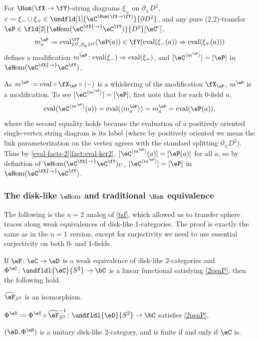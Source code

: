 \documentclass[12pt,reqno]{amsart}
\newcommand{\eFun}{{\eH}\mathrm{om}}
\newcommand{\eHom}{{\eH}\mathrm{om}}
\newcommand{\eval}{\mathrm{eval}}
\newcommand{\psn}{\Phi}
\newcommand{\C}{\eC}
\newcommand{\D}{\eD}
\DeclareRobustCommand{\coloneq}{\mathrel{\vcenter{\baselineskip0.5ex\lineskiplimit0pt\hbox{\scriptsize{\upshape.}}\hbox{\scriptsize{\upshape.}}}}=}
\newcommand{\lU}[1]{#1_U}
\begin{document}
\begin{lemma}[$\C^{(-)}$ is surjective on (2,2)-transfors]
\label{lem:surj-2-fields}
For $\Hom(\fX\to\fY)$-string diagrams $\xi_{\pm}$ on $\partial_\pm D^2$, $c\coloneq \xi_-\cup\xi_+\in\undfld[1]{\C^{\Hom(\fX\to\fY)}}{\partial D^2}$, and any pure (2,2)-transfor $\eP\in\fld[2]{\eFun(\C^\fX{\to}\C^\fY)}{D^2}[\C^{c}]$,
\[
m^\eP_a \coloneq\eval_{D^2,\partial_{\pm}D^2}^\fY(\eP(a)) \in\fY(\eval(\xi_-(a))\Rightarrow\eval(\xi_+(a)))
\]
defines a modification $m^\eP\colon\eval(\xi_-)\Rightarrow\eval(\xi_+)$, and $[\C^{\langle m^\eP\rangle}]=[\eP]$ in $\eFun(\C^\fX{\to}\C^\fY)$.
\end{lemma}

\begin{pf}
As $m^\eP\coloneq\eval\circ\fX_\eP\circ\langle-\rangle$ is a whiskering of the modification $\fX_\eP$, $m^\eP$ is a modification. To see $[\C^{\langle m^\eP\rangle}]=[\eP]$, first note that for each $0$-field $a$,
$$\mathrm{eval}(\C^{\langle m^\eP\rangle}(a))=\eval(\langle m^\eP_a\rangle)= m^\eP_a=\mathrm{eval}(\eP(a)),$$
where the second equality holds because the evaluation of a positively oriented single-vertex string diagram is its label (where by positively oriented we mean the link parameterization on the vertex agrees with the standard splitting $\partial_{\pm}D^2$). Thus by \cref{eval-facts-2}\ref{fact:eval-ker2}, $[\C^{\langle m^\eP\rangle}(a)]=[\eP(a)]$ for all $a$, so by definition of $\lU{\eFun(\C^\fX{\to}\C^\fY)}$, $[\C^{\langle m^\eP\rangle}]=[\eP]$ in $\eHom(\C^\fX{\to}\C^\fY)$. 
\end{pf}

\subsubsection{The disk-like \texorpdfstring{$\eH\mathrm{om}$}{H} and traditional \texorpdfstring{$\Hom$}{Hom} equivalence}

The following is the $n=2$ analog of \cref{tsf}, which allowed us to transfer sphere traces along weak equivalences of disk-like 1-categories. The proof is exactly the same as in the $n=1$ version, except for surjectivity we need to use essential surjectivity on both 0- and 1-fields.

\begin{proposition}
\label{tsf2}
If $\eF \colon \eC \to \eD$ is a weak equivalence of disk-like 2-categories and $\psn^\C\colon \undfldl{\C}{S^2} \to \bC$ is a linear functional satisfying \ref{2psnP}, then the following hold.
\begin{lst} 
\item\label{tsf2a} $\widehat\eF_{S^2}$ is an isomorphism.
\item\label{tsf2b} $\psn^{\eD} \coloneq \psn^{\eC} \circ \widehat{\eF}_{S^2}^{-1} \colon \undfldl{\D}{S^2} \to \bC$ satisfies \ref{2psnP}.
\item\label{tsf2c} $(\eD, \psn^{\eD})$ is a
unitary disk-like 2-category, and is finite if and only if $\eC$ is.
\end{lst}
\end{proposition}
\end{document}
